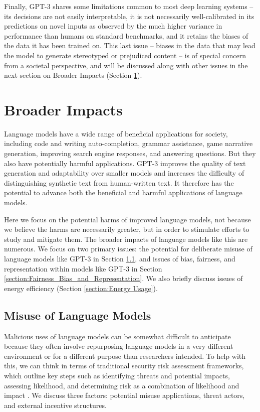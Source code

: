 \documentclass{article}
\begin{document}
Finally, GPT-3 shares some limitations common to most deep learning systems -- its decisions are not easily interpretable, it is not necessarily well-calibrated in its predictions on novel inputs as observed by the much higher variance in performance than humans on standard benchmarks, and it retains the biases of the data it has been trained on.  This last issue -- biases in the data that may lead the model to generate stereotyped or prejudiced content -- is of special concern from a societal perspective, and will be discussed along with other issues in the next section on Broader Impacts (Section \ref{section:Broader_Impacts}).

\section{Broader Impacts}
\label{section:Broader_Impacts}
Language models have a wide range of beneficial applications for society,  including code and writing auto-completion, grammar assistance, game narrative generation, improving search engine responses, and answering questions. But they also have potentially harmful applications. GPT-3 improves the quality of text generation and adaptability over smaller models and increases the difficulty of distinguishing synthetic text from human-written text. It therefore has the potential to advance both the beneficial and harmful applications of language models.

Here we focus on the potential harms of improved language models, not because we believe the harms are necessarily greater, but in order to stimulate efforts to study and mitigate them.  The broader impacts of language models like this are numerous. We focus on two primary issues: the potential for deliberate misuse of language models like GPT-3 in Section \ref{section:misuse_of_language_models}, and issues of bias, fairness, and representation within models like GPT-3 in Section \ref{section:Fairness_Bias_and_Representation}.  We also briefly discuss issues of energy efficiency (Section \ref{section:Energy Usage}).
 
    \subsection{Misuse of Language Models}
    \label{section:misuse_of_language_models}
Malicious uses of language models can be somewhat difficult to anticipate because they often involve repurposing language models in a very different environment or for a different purpose than researchers intended. To help with this, we can think in terms of traditional security risk assessment frameworks, which outline key steps such as identifying threats and potential impacts, assessing likelihood, and determining risk as a combination of likelihood and impact \cite{ross2012risk}.  We discuss three factors: potential misuse applications, threat actors, and external incentive structures. 
\end{document}
